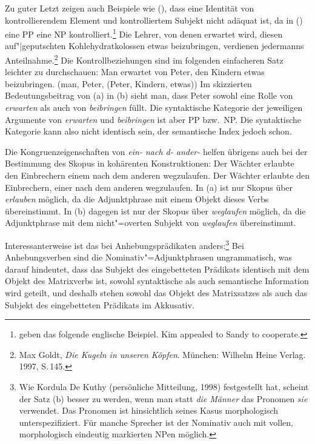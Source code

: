 Zu guter Letzt zeigen auch Beispiele wie (), dass eine Identität von kontrollierendem Element und kontrolliertem
Subjekt nicht adäquat ist, da in () eine PP eine NP kontrolliert.\footnote{
        \citet*[]{ps2} geben das folgende englische
        Beispiel.
        \ea
        Kim appealed to Sandy to cooperate.
        \zlast
}
\ea{}
Die Lehrer, von denen erwartet wird, diesen auf"|geputschten Kohlehydratkolossen etwas beizubringen,
verdienen jedermanns Anteilnahme.\footnote{
        Max Goldt, \emph{Die Kugeln in unseren Köpfen}. München: Wilhelm Heine Verlag. 1997, S.\,145.
}
\z
Die Kontrollbeziehungen sind im folgenden einfacheren Satz leichter zu durchschauen:
\eal
\ex Man erwartet von Peter, den Kindern etwas beizubringen.
\ex {}(man, Peter, (Peter, Kindern, etwas))
\zl
Im skizzierten Bedeutungsbeitrag von (a) in (b) sieht man, dass Peter sowohl eine Rolle
von \emph{erwarten} als auch von \emph{beibringen} füllt. Die syntaktische Kategorie der jeweiligen
Argumente von \emph{erwarten} und \emph{beibringen} ist aber PP bzw.\ NP. Die syntaktische Kategorie
kann also nicht identisch sein, der semantische Index jedoch schon.

Die Kongruenzeigenschaften von {\em ein- nach d- ander-} helfen übrigens auch
bei der Bestimmung des Skopus in kohärenten Konstruktionen:
\eal
\ex Der Wächter erlaubte den Einbrechern    einem     nach  dem anderen wegzulaufen.
\ex Der Wächter erlaubte den Einbrechern,   einer     nach  dem anderen wegzulaufen.
\zl
In (a) ist nur Skopus über \emph{erlauben} möglich, da die Adjunktphrase mit einem Objekt dieses Verbs
übereinstimmt. In (b) dagegen ist nur der Skopus über \emph{weglaufen} möglich, da die Adjunktphrase
mit dem nicht"=overten Subjekt von \emph{weglaufen} übereinstimmt.

Interessanterweise ist das bei Anhebungsprädikaten anders:\footnote{
       Wie Kordula De Kuthy (persönliche Mitteilung, 1998) festgestellt hat, scheint der Satz (b) besser zu werden,
       wenn man statt \emph{die Männer} das Pronomen \emph{sie} verwendet.
        \z
        Das Pronomen ist hinsichtlich seines Kasus morphologisch unterspezifiziert. Für manche Sprecher
        ist der Nominativ auch mit vollen, morphologisch eindeutig markierten NPen möglich.
}
\eal
{}
\zl
Bei Anhebungsverben sind die Nominativ"=Adjunktphrasen ungrammatisch, was darauf hindeutet,
dass das Subjekt des eingebetteten Prädikats identisch mit dem Objekt des Matrixverbs ist, \dash
sowohl syntaktische als auch semantische Information wird geteilt, und deshalb stehen sowohl das Objekt
des Matrixsatzes als auch das Subjekt des eingebetteten Prädikats im Akkusativ.

